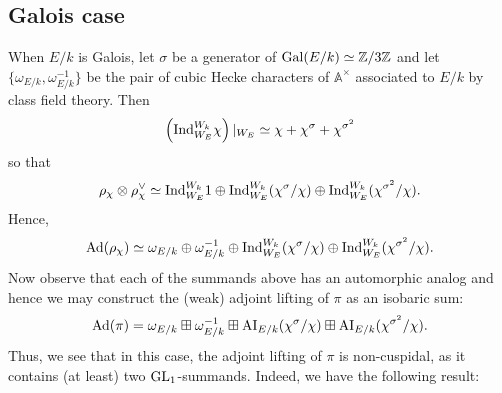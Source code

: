 \documentclass[11pt]{amsart}
\theoremstyle{plain}
\numberwithin{equation}{section}
\newcommand{\Z}{\mathbb Z}
\newcommand{\A}{\mathbb A}
\def\GL{{\rm GL}}
\def\A{{\mathbb A}}
\def\Z{{\mathbb Z}}
\begin{document}
\subsection{\bf Galois case}
 When $E/k$ is Galois,  let $\sigma$ be a generator of  ${\rm Gal}(E/k) \simeq \Z/3\Z$ and let $\{ \omega_{E/k}, \omega_{E/k}^{-1} \}$ be the pair of cubic Hecke characters of $\A^{\times}$ associated to $E/k$ by class field theory. Then
\[  \left(  {\rm Ind}_{W_E}^{W_k} \chi \right)|_{W_E}  \simeq \chi + \chi^{\sigma} + \chi^{\sigma^2} \]
so that
 \[   \rho_{\chi} \otimes \rho_{\chi}^{\vee} \simeq  {\rm Ind}_{W_E}^{W_k} 1  \oplus   {\rm Ind}_{W_E}^{W_k} (\chi^{\sigma}/\chi ) \oplus   {\rm Ind}_{W_E}^{W_k} (\chi^{\sigma^2}/\chi). \] 
Hence,
\[  {\rm Ad}(\rho_{\chi}) \simeq \omega_{E/k} \oplus \omega_{E/k}^{-1} \oplus  {\rm Ind}_{W_E}^{W_k} (\chi^{\sigma}/\chi ) \oplus  {\rm Ind}_{W_E}^{W_k} (\chi^{\sigma^2}/\chi).\]
Now observe that each of the summands above has an automorphic analog and hence we may construct the (weak) adjoint lifting of $\pi$ as an isobaric sum:
\begin{equation} \label{E:Add}
 {\rm Ad}(\pi) =  \omega_{E/k} \boxplus \omega_{E/k}^{-1} \boxplus  {\rm AI}_{E/k}( \chi^{\sigma}/ \chi) \boxplus {\rm AI}_{E/k}(\chi^{\sigma^2}/ \chi). \end{equation}
Thus, we see that in this case, the adjoint lifting of $\pi$ is non-cuspidal, as it contains (at least) two $\GL_1$-summands. Indeed, we have the following result:
\vskip 5pt
\end{document}
